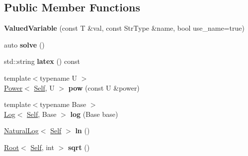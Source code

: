 \subsection*{Public Member Functions}
\begin{DoxyCompactItemize}
\item 
\hypertarget{classlatex_1_1math_1_1ValuedVariable_a9a6f810a0147890ac6788d5862d5b567}{{\bfseries Valued\-Variable} (const T \&val, const Str\-Type \&name, bool use\-\_\-name=true)}\label{classlatex_1_1math_1_1ValuedVariable_a9a6f810a0147890ac6788d5862d5b567}

\item 
\hypertarget{classlatex_1_1math_1_1ValuedVariable_ad643db16a3e736a6ddcdbdbaae153d13}{auto {\bfseries solve} ()}\label{classlatex_1_1math_1_1ValuedVariable_ad643db16a3e736a6ddcdbdbaae153d13}

\item 
\hypertarget{classlatex_1_1math_1_1ValuedVariable_a52382b093d59ab8366400366569cee75}{std\-::string {\bfseries latex} () const }\label{classlatex_1_1math_1_1ValuedVariable_a52382b093d59ab8366400366569cee75}

\item 
\hypertarget{classlatex_1_1math_1_1ValuedVariable_ad1882b037951b525dfed2e174d5d886f}{{\footnotesize template$<$typename U $>$ }\\\hyperlink{classlatex_1_1math_1_1Power}{Power}$<$ \hyperlink{classlatex_1_1math_1_1ValuedVariable}{Self}, U $>$ {\bfseries pow} (const U \&power)}\label{classlatex_1_1math_1_1ValuedVariable_ad1882b037951b525dfed2e174d5d886f}

\item 
\hypertarget{classlatex_1_1math_1_1ValuedVariable_a279bab3b07c1b57bf6cfb74334b97af7}{{\footnotesize template$<$typename Base $>$ }\\\hyperlink{classlatex_1_1math_1_1Log}{Log}$<$ \hyperlink{classlatex_1_1math_1_1ValuedVariable}{Self}, Base $>$ {\bfseries log} (Base base)}\label{classlatex_1_1math_1_1ValuedVariable_a279bab3b07c1b57bf6cfb74334b97af7}

\item 
\hypertarget{classlatex_1_1math_1_1ValuedVariable_a4517d6c7dc46174f05a2e49e555754fd}{\hyperlink{classlatex_1_1math_1_1NaturalLog}{Natural\-Log}$<$ \hyperlink{classlatex_1_1math_1_1ValuedVariable}{Self} $>$ {\bfseries ln} ()}\label{classlatex_1_1math_1_1ValuedVariable_a4517d6c7dc46174f05a2e49e555754fd}

\item 
\hypertarget{classlatex_1_1math_1_1ValuedVariable_a46d3d3dd404d85045a5f121ddbd04390}{\hyperlink{classlatex_1_1math_1_1Root}{Root}$<$ \hyperlink{classlatex_1_1math_1_1ValuedVariable}{Self}, int $>$ {\bfseries sqrt} ()}\label{classlatex_1_1math_1_1ValuedVariable_a46d3d3dd404d85045a5f121ddbd04390}

\end{DoxyCompactItemize}
